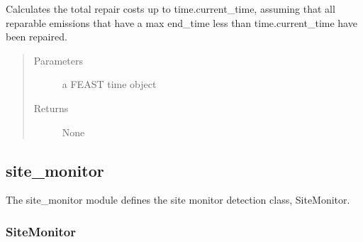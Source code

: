 \documentclass[letterpaper,10pt,english]{sphinxmanual}
\begin{document}
\begin{fulllineitems}
\begin{fulllineitems}
\label{\detokenize{index:feast.DetectionModules.ldar_program.LDARProgram.calc_rep_costs}}
Calculates the total repair costs up to time.current\_time, assuming that all reparable emissions that have a
max end\_time less than time.current\_time have been repaired.
\begin{quote}\begin{description}
\item[{Parameters}] \leavevmode
{} \textendash{} a FEAST time object

\item[{Returns}] \leavevmode
None

\end{description}\end{quote}

\end{fulllineitems}


\end{fulllineitems}



\subsection{site\_monitor}
\label{\detokenize{index:module-feast.DetectionModules.site_monitor}}\label{\detokenize{index:site-monitor}}
The site\_monitor module defines the site monitor detection class, SiteMonitor.


\subsubsection{SiteMonitor}
\label{\detokenize{index:sitemonitor}}
\end{document}

